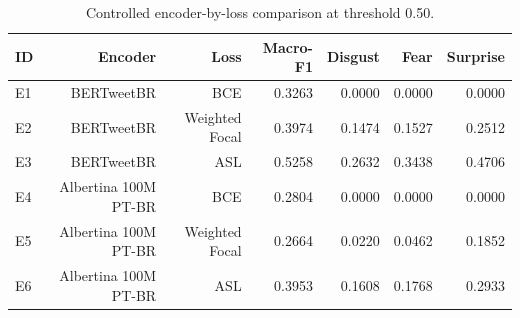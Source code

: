 \begin{table}[t]
\centering
\small
\caption{Controlled encoder-by-loss comparison at threshold 0.50.}
\label{tab:encoders}
\begin{tabular}{lrrrrrr}
\toprule
ID & Encoder & Loss & Macro-F1 & Disgust & Fear & Surprise \\
\midrule
E1 & BERTweetBR & BCE & 0.3263 & 0.0000 & 0.0000 & 0.0000 \\
E2 & BERTweetBR & Weighted Focal & 0.3974 & 0.1474 & 0.1527 & 0.2512 \\
E3 & BERTweetBR & ASL & 0.5258 & 0.2632 & 0.3438 & 0.4706 \\
E4 & Albertina 100M PT-BR & BCE & 0.2804 & 0.0000 & 0.0000 & 0.0000 \\
E5 & Albertina 100M PT-BR & Weighted Focal & 0.2664 & 0.0220 & 0.0462 & 0.1852 \\
E6 & Albertina 100M PT-BR & ASL & 0.3953 & 0.1608 & 0.1768 & 0.2933 \\
\bottomrule
\end{tabular}
\end{table}
